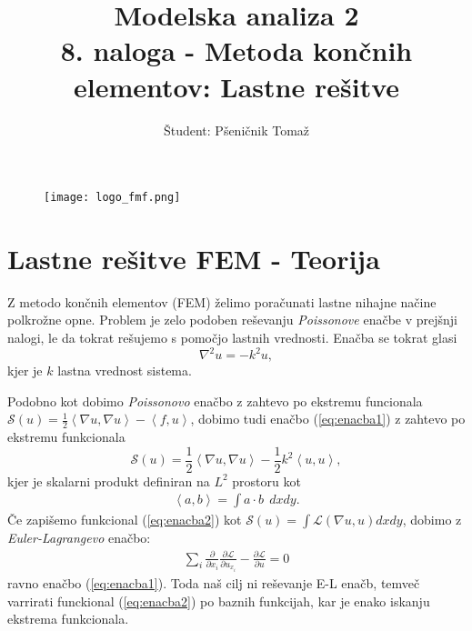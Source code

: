 \documentclass[12pt,a4paper]{article}
\title{\textbf{Modelska analiza 2} \\ 8. naloga - Metoda končnih elementov: Lastne rešitve \\}
\author{Študent: Pšeničnik Tomaž}
\begin{document}

	\begin{figure} [h]
  \centering
  \texttt{[image: logo\_fmf.png]}
  \maketitle
\end{figure}
	
	
	
	\newpage
	
	
	
\section*{Lastne rešitve FEM - Teorija}

Z metodo končnih elementov (FEM) želimo poračunati lastne nihajne načine polkrožne opne. Problem je zelo podoben reševanju \textit{Poissonove} enačbe v prejšnji nalogi, le da tokrat rešujemo s pomočjo lastnih vrednosti. Enačba se tokrat glasi 
\begin{equation} \label{eq:enacba1}
\nabla ^{2} u =-k^{2} u,
\end{equation}
kjer je $k$ lastna vrednost sistema.

Podobno kot dobimo \textit{Poissonovo} enačbo z zahtevo po ekstremu funcionala $\mathcal{S}(u) = \frac{1}{2} \left\langle \nabla u , \nabla u \right\rangle - \left\langle f,u \right\rangle$, dobimo tudi enačbo (\ref{eq:enacba1}) z zahtevo po ekstremu funkcionala
\begin{equation} \label{eq:enacba2}
\mathcal{S}(u) = \frac{1}{2} \left\langle \nabla u , \nabla u \right\rangle - \frac{1}{2} k^{2}\left\langle u,u \right\rangle,
\end{equation}
kjer je skalarni produkt definiran  na $L^{2}$ prostoru kot
\begin{align*}
\left\langle a ,b \right\rangle= \int a \cdot b  \ \ dxdy.
\end{align*}
Če zapišemo funkcional (\ref{eq:enacba2}) kot $\mathcal{S}(u)=\int \mathcal{L}(\nabla u,u) dx dy$, dobimo z \textit{Euler-Lagrangevo} enačbo:
\begin{align*}
\sum _i \frac{\partial}{ \partial x_i} \frac{ \partial \mathcal{L}}{ \partial u_{x{_i}}} - \frac{ \partial \mathcal{L}}{\partial u}=0
\end{align*}
ravno enačbo (\ref{eq:enacba1}). Toda naš cilj ni reševanje E-L enačb, temveč varrirati funckional (\ref{eq:enacba2}) po baznih funkcijah, kar je enako iskanju ekstrema funkcionala. 
\end{document}
